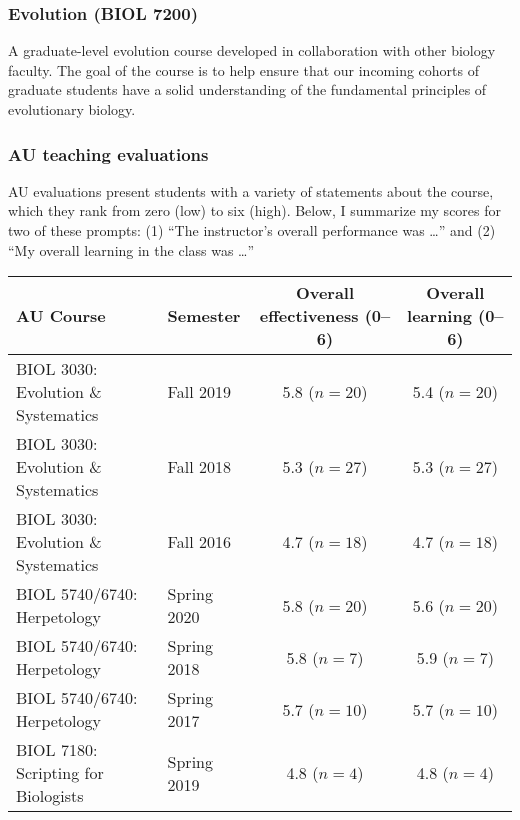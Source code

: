 \subsubsection*{Evolution (BIOL 7200)}
A graduate-level evolution course developed in collaboration with other biology
faculty.
The goal of the course is to help ensure that our incoming cohorts of graduate
students have a solid understanding of the fundamental principles of
evolutionary biology.

\subsubsection*{AU teaching evaluations}
AU evaluations present students with a variety of statements about the
course,
which they rank from zero (low) to six (high).
Below, I summarize my scores for two of these prompts:
(1) ``The instructor's overall performance was \ldots''
and
(2) ``My overall learning in the class was \ldots''
\begin{center}
    \sffamily\small
\begin{tabular}{l l c c}
    \hline
    \textbf{AU Course} & \textbf{Semester} & \textbf{Overall effectiveness} (0--6) & \textbf{Overall learning} (0--6) \\
    \hline
    BIOL 3030: Evolution \& Systematics & Fall 2019 & 5.8 ($n = 20$) & 5.4 ($n = 20$) \\
    BIOL 3030: Evolution \& Systematics & Fall 2018 & 5.3 ($n = 27$) & 5.3 ($n = 27$) \\
    BIOL 3030: Evolution \& Systematics & Fall 2016 & 4.7 ($n = 18$) & 4.7 ($n = 18$) \\
    BIOL 5740/6740: Herpetology & Spring 2020 & 5.8 ($n = 20$) & 5.6 ($n = 20$) \\
    BIOL 5740/6740: Herpetology & Spring 2018 & 5.8 ($n = 7$) & 5.9 ($n = 7$) \\
    BIOL 5740/6740: Herpetology & Spring 2017 & 5.7 ($n = 10$) & 5.7 ($n = 10$) \\
    BIOL 7180: Scripting for Biologists & Spring 2019 & 4.8 ($n = 4$) & 4.8 ($n = 4$) \\
    \hline
\end{tabular}
\end{center}

